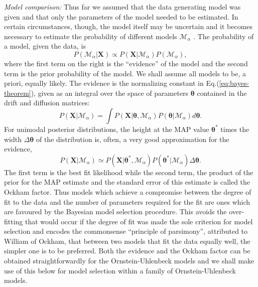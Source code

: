 \documentclass[english,aps, twocolumn, pre,superscriptaddress, notitlepage]{revtex4-1}
\begin{document}
\emph{Model comparison: }Thus far we assumed that the data generating
model was given and that only the parameters of the model needed to
be estimated. In certain circumstances, though, the model itself may
be uncertain and it becomes necessary to estimate the probability
of different models $\mathcal{M}_{\alpha}$ \cite{jeffreys1998theory,kashyap1977bayesian,mackay1992bayesian,zellner1984,gregory2005bayesian}.
The probability of a model, given the data, is
\begin{equation}
P(\mathcal{M}_{\alpha}|\boldsymbol{X})\propto P(\boldsymbol{X}|\mathcal{M}_{\alpha})P(\mathcal{M}_{\alpha}),
\end{equation}
where the first term on the right is the ``evidence'' of the model
and the second term is the prior probability of the model. We shall
assume all models to be, a priori, equally likely. The evidence is
the normalizing constant in Eq.(\ref{eq:bayes-theorem}), given as
an integral over the space of parameters $\boldsymbol{\theta}$ contained
in the drift and diffusion matrices:
\begin{equation}
P(\boldsymbol{X}|\mathcal{M}_{\alpha})=\int P(\boldsymbol{X}|\boldsymbol{\theta},\mathcal{M}_{\alpha})P(\boldsymbol{\theta}|\mathcal{M}_{\alpha})d\boldsymbol{\theta}.
\end{equation}
For unimodal posterior distributions, the height at the MAP value
$\boldsymbol{\theta}^{\ast}$ times the width $\Delta\boldsymbol{\theta}$
of the distribution is, often, a very good approximation for the evidence,
\begin{equation}
P(\boldsymbol{X}|\mathcal{M}_{\alpha})\simeq P(\boldsymbol{X}|\boldsymbol{\theta}^{\ast},\mathcal{M}_{\alpha})P(\boldsymbol{\theta}^{\ast}|\mathcal{M}_{\alpha})\Delta\boldsymbol{\theta}.\label{eq:evidence}
\end{equation}
The first term is the best fit likelihood while the second term, the
product of the prior for the MAP estimate and the standard error of
this estimate is called the Ockham factor. Thus models which achieve
a compromise between the degree of fit to the data and the number
of parameters required for the fit are ones which are favoured by
the Bayesian model selection procedure. This avoids the over-fitting
that would occur if the degree of fit was made the sole criterion
for model selection and encodes the commonsense ``principle of parsimony'',
 attributed to William of Ockham, that between two models that fit
the data equally well, the simpler one is to be preferred. Both the
evidence and the Ockham factor can be obtained straightforwardly for
the Ornstein-Uhlenbeck models and we shall make use of this below
for model selection within a family of Ornstein-Uhlenbeck models. 
\end{document}
